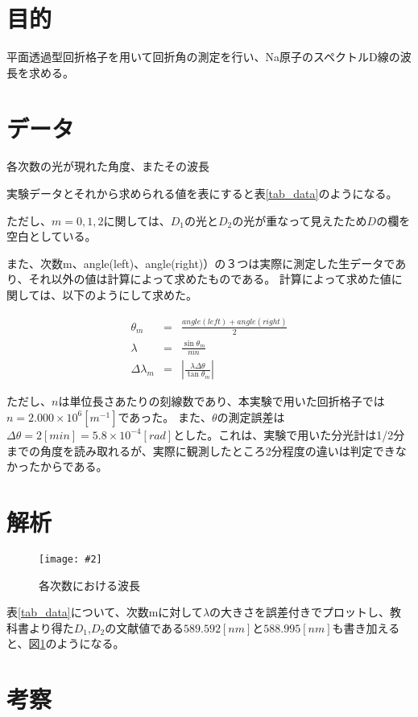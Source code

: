 \documentclass[uplatex,11pt]{jsarticle}
\newcommand{\fg}[3]{ %
    \begin{figure}
        \begin{center}
            \texttt{[image: \#2]}
            \caption{#3}
            \label{fg_#1}
        \end{center}
    \end{figure}
}
\newcommand{\tab}[4]{ %
    \begin{table}[htb]
        \centering
        \caption{#3}
        
        \label{tab_#1}
    \end{table}
}
\newcommand{\fr}[1]{図\ref{fg_#1}}
\newcommand{\tr}[1]{表\ref{tab_#1}}
\begin{document}
\section{目的}

平面透過型回折格子を用いて回折角の測定を行い、Na原子のスペクトルD線の波長を求める。

\section{データ}

\tab{data}{csv/data.csv}{各次数の光が現れた角度、またその波長}{1}

実験データとそれから求められる値を表にすると\tr{data}のようになる。

ただし、$m=0,1,2$に関しては、$D_1$の光と$D_2$の光が重なって見えたため$D$の欄を空白としている。

また、次数m、angle(left)、angle(right)）の３つは実際に測定した生データであり、それ以外の値は計算によって求めたものである。
計算によって求めた値に関しては、以下のようにして求めた。

\begin{eqnarray*}
    \theta_m         & = & \frac{angle(left) + angle(right)}{2} \\
    \lambda          & = & \frac{\sin\theta_m}{mn} \\
    \Delta \lambda_m & = & \left| \frac{\lambda\Delta\theta}{\tan\theta_m} \right|
\end{eqnarray*}

ただし、$n$は単位長さあたりの刻線数であり、本実験で用いた回折格子では$n = 2.000 \times 10^{6}[m^{-1}]$であった。
また、$\theta$の測定誤差は$\Delta\theta = 2[min] = 5.8 \times 10^{-4} [rad]$とした。これは、実験で用いた分光計は1/2分までの角度を読み取れるが、実際に観測したところ2分程度の違いは判定できなかったからである。


\section{解析}

\fg{data}{graph/a_with_calc.png}{各次数における波長}

\tr{data}について、次数mに対して$\lambda$の大きさを誤差付きでプロットし、教科書より得た$D_1$,$D_2$の文献値である$589.592[nm]$と$588.995[nm]$も書き加えると、\fr{data}のようになる。

\section{考察}
\end{document}

